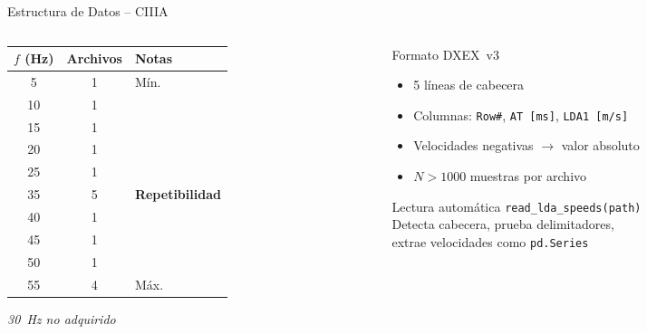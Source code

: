 \documentclass[aspectratio=169,12pt]{beamer}
\begin{document}
\begin{frame}{Estructura de Datos -- CIIIA}
	\begin{columns}
		\begin{column}{0.45\textwidth}
			\centering\scriptsize
			\begin{tabular}{ccl}
				\toprule
				\textbf{$f$ (Hz)} & \textbf{Archivos} & \textbf{Notas}         \\
				\midrule
				5                 & 1                 & Mín.                   \\
				10                & 1                 &                        \\
				15                & 1                 &                        \\
				20                & 1                 &                        \\
				25                & 1                 &                        \\
				\rowcolor{aerogreen!15}
				35                & 5                 & \textbf{Repetibilidad} \\
				40                & 1                 &                        \\
				45                & 1                 &                        \\
				50                & 1                 &                        \\
				55                & 4                 & Máx.                   \\
				\bottomrule
			\end{tabular}
			\vspace{0.3em}

			\textit{\tiny 30~Hz no adquirido}
		\end{column}
		\begin{column}{0.52\textwidth}
			\begin{block}{Formato DXEX~v3}
				\scriptsize
				\begin{itemize}
					\item 5 líneas de cabecera
					\item Columnas: \texttt{Row\#}, \texttt{AT [ms]},
					      \texttt{LDA1 [m/s]}
					\item Velocidades negativas $\to$ valor absoluto
					\item $N > 1000$ muestras por archivo
				\end{itemize}
			\end{block}
			\vspace{0.2em}
			\begin{exampleblock}{Lectura automática}
				\scriptsize
				\texttt{read\_lda\_speeds(path)}\\
				Detecta cabecera, prueba delimitadores,\\
				extrae velocidades como \texttt{pd.Series}
			\end{exampleblock}
		\end{column}
	\end{columns}
\end{frame}
\end{document}
